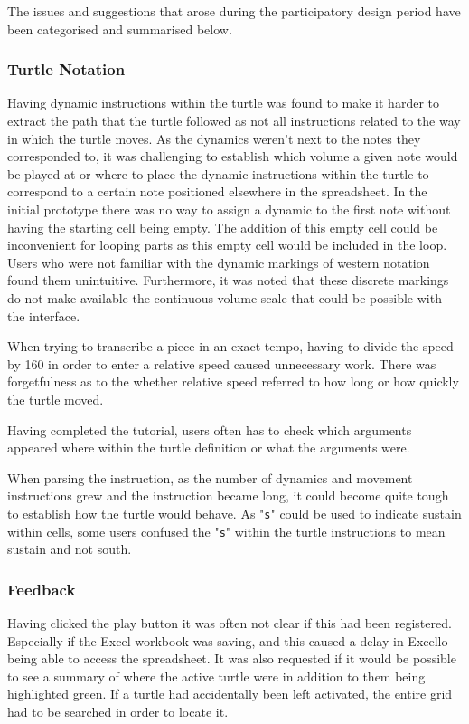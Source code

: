 The issues and suggestions that arose during the participatory design period have been categorised and summarised below.

\subsubsection{Turtle Notation}

Having dynamic instructions within the turtle was found to make it harder to extract the path that the turtle followed as not all instructions related to the way in which the turtle moves. As the dynamics weren't next to the notes they corresponded to, it was challenging to establish which volume a given note would be played at or where to place the dynamic instructions within the turtle to correspond to a certain note positioned elsewhere in the spreadsheet. In the initial prototype there was no way to assign a dynamic to the first note without having the starting cell being empty. The addition of this empty cell could be inconvenient for looping parts as this empty cell would be included in the loop. Users who were not familiar with the dynamic markings of western notation found them unintuitive. Furthermore, it was noted that these discrete markings do not make available the continuous volume scale that could be possible with the interface.

When trying to transcribe a piece in an exact tempo, having to divide the speed by 160 in order to enter a relative speed caused unnecessary work. There was forgetfulness as to the whether relative speed referred to how long or how quickly the turtle moved.

Having completed the tutorial, users often has to check which arguments appeared where within the turtle definition or what the arguments were.

When parsing the instruction, as the number of dynamics and movement instructions grew and the instruction became long, it could become quite tough to establish how the turtle would behave. As "\texttt{s}" could be used to indicate sustain within cells, some users confused the "\texttt{s}" within the turtle instructions to mean sustain and not south.

\subsubsection{Feedback}

Having clicked the play button it was often not clear if this had been registered. Especially if the Excel workbook was saving, and this caused a delay in Excello being able to access the spreadsheet. It was also requested if it would be possible to see a summary of where the active turtle were in addition to them being highlighted green. If a turtle had accidentally been left activated, the entire grid had to be searched in order to locate it.


